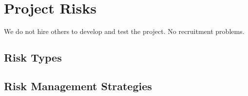 \section{Project Risks}
We do not hire others to develop and test the project.
No recruitment problems.
%
\subsection{Risk Types}
\lipsum[100]
%
\subsection{Risk Management Strategies}
\lipsum[100]
%